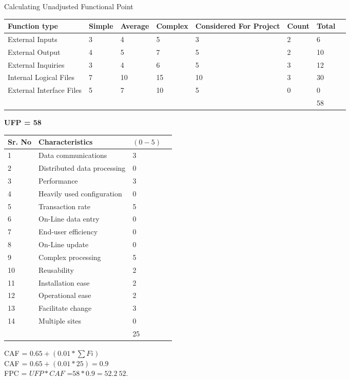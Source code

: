 \label{sec:effort}
Calculating Unadjusted Functional Point
\begin{center}
	\begin{tabular}{ | l | l | l | l | l | l | l | p{3cm} |}
		\hline
		Function type & Simple & Average & Complex & Considered For Project & Count &Total \\ \hline
		External Inputs & 3 & 4 & 5 & 3 & 2 & 6 \\ \hline
		External Output & 4 & 5 & 7 & 5 & 2 & 10 \\ \hline
		External Inquiries  & 3 & 4 & 6 & 5 & 3 & 12 \\ \hline
		Internal Logical Files & 7 & 10 & 15 & 10 & 3 & 30 \\ \hline
		External Interface Files  & 5 & 7 & 10 & 5 & 0 & 0 \\ \hline
		   &   &   &   &   &   & 58 \\ \hline
	\end{tabular}
\end{center}
\textbf{UFP = 58}

\begin{center}
	\begin{tabular}{ | l | l | l | p{3cm} |}
		\hline
		Sr. No & Characteristics & $(0-5)$ \\ \hline
		1 & Data communications & 3  \\ \hline
		2 & Distributed data processing  & 0  \\ \hline
		3 & Performance & 3  \\ \hline
		4 & Heavily used configuration & 0  \\ \hline
		5 & Transaction rate & 5  \\ \hline
		6 & On-Line data entry & 0  \\ \hline
		7 & End-user efficiency & 0  \\ \hline
		8 & On-Line update  & 0  \\ \hline
		9 & Complex processing  & 5  \\ \hline
		10 & Reusability & 2  \\ \hline
		11 & Installation ease & 2  \\ \hline
		12 & Operational ease & 2  \\ \hline
		13 & Facilitate change  & 3  \\ \hline
		14 & Multiple sites  & 0  \\ \hline
		  &   & 25  \\ \hline
	\end{tabular}
\end{center}

CAF = $0.65+ (0.01 * ∑Fi)$ \\



CAF = $0.65+ (0.01 * 25) = 0.9$ \\



FPC = $UFP * CAF$
=$58*0.9 = 52.2 ~ 52$.